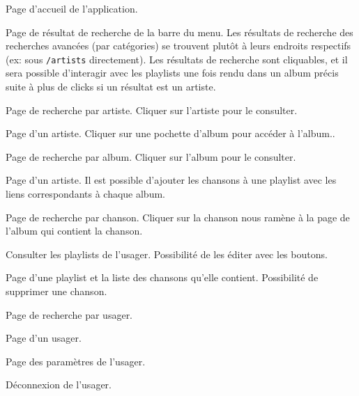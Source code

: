 \documentclass[12pt]{/home/samuel/Documents/GLO/latex/documentClass/GLO_ULAVAL}
\begin{document}
\begin{description}[style=nextline]
  \item[\texttt{\slash{}}]\item[] Page d'accueil de l'application.
  \item[\texttt{\slash{}search}] Page de résultat de recherche de la barre du menu. Les résultats de recherche des recherches avancées (par catégories) se trouvent plutôt à leurs endroits respectifs (ex: sous \texttt{\slash{}artists} directement). Les résultats de recherche sont cliquables, et il sera possible d'interagir avec les playlists une fois rendu dans un album précis suite à plus de clicks si un résultat est un artiste.
  \item[\texttt{\slash{}artists}] Page de recherche par artiste. Cliquer sur l'artiste pour le consulter.
  \item[\texttt{\slash{}artists\slash{}:id}] Page d'un artiste. Cliquer sur une pochette d'album pour accéder à l'album..
  \item[\texttt{\slash{}albums}] Page de recherche par album. Cliquer sur l'album pour le consulter.
  \item[\texttt{\slash{}albums\slash{}:id}] Page d'un artiste. Il est possible d'ajouter les chansons à une playlist avec les liens correspondants à chaque album.
  \item[\texttt{\slash{}tracks}] Page de recherche par chanson. Cliquer sur la chanson nous ramène à la page de l'album qui contient la chanson.
  \item[\texttt{\slash{}playlists}] Consulter les playlists de l'usager. Possibilité de les éditer avec les boutons.
  \item[\texttt{\slash{}playlists\slash{}:id}] Page d'une playlist et la liste des chansons qu'elle contient. Possibilité de supprimer une chanson.
  \item[\texttt{\slash{}users}] Page de recherche par usager.
  \item[\texttt{\slash{}account}] Page d'un usager.
  \item[\texttt{\slash{}settings}] Page des paramètres de l'usager.
  \item[\texttt{\slash{}logout}] Déconnexion de l'usager.
\end{description}
\end{document}
